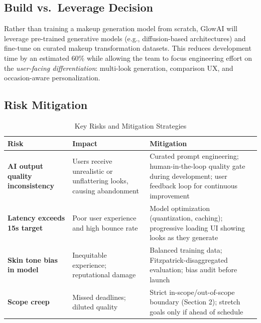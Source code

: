 \documentclass[11pt, letterpaper]{article}
\begin{document}
\subsection{Build vs.\ Leverage Decision}

Rather than training a makeup generation model from scratch, GlowAI will leverage pre-trained generative models (e.g., diffusion-based architectures) and fine-tune on curated makeup transformation datasets. This reduces development time by an estimated 60\% while allowing the team to focus engineering effort on the \emph{user-facing differentiation}: multi-look generation, comparison UX, and occasion-aware personalization.

\subsection{Risk Mitigation}

\begin{table}[H]
\centering
\caption{Key Risks and Mitigation Strategies}
\begin{tabularx}{\textwidth}{>{\bfseries}p{3.5cm} X X}
\toprule
\textbf{Risk} & \textbf{Impact} & \textbf{Mitigation} \\
\midrule
AI output quality inconsistency & Users receive unrealistic or unflattering looks, causing abandonment & Curated prompt engineering; human-in-the-loop quality gate during development; user feedback loop for continuous improvement \\
\addlinespace
Latency exceeds 15s target & Poor user experience and high bounce rate & Model optimization (quantization, caching); progressive loading UI showing looks as they generate \\
\addlinespace
Skin tone bias in model & Inequitable experience; reputational damage & Balanced training data; Fitzpatrick-disaggregated evaluation; bias audit before launch \\
\addlinespace
Scope creep & Missed deadlines; diluted quality & Strict in-scope/out-of-scope boundary (Section 2); stretch goals only if ahead of schedule \\
\bottomrule
\end{tabularx}
\end{table}

\newpage
\end{document}
